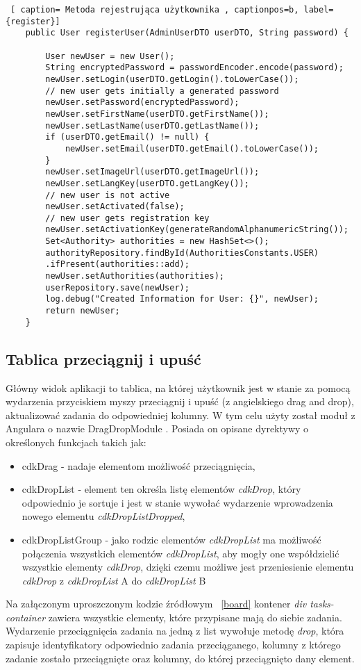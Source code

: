 \begin{lstlisting} [ caption= Metoda rejestrująca użytkownika , captionpos=b, label={register}]
	public User registerUser(AdminUserDTO userDTO, String password) {
		
		User newUser = new User();
		String encryptedPassword = passwordEncoder.encode(password);
		newUser.setLogin(userDTO.getLogin().toLowerCase());
		// new user gets initially a generated password
		newUser.setPassword(encryptedPassword);
		newUser.setFirstName(userDTO.getFirstName());
		newUser.setLastName(userDTO.getLastName());
		if (userDTO.getEmail() != null) {
			newUser.setEmail(userDTO.getEmail().toLowerCase());
		}
		newUser.setImageUrl(userDTO.getImageUrl());
		newUser.setLangKey(userDTO.getLangKey());
		// new user is not active
		newUser.setActivated(false);
		// new user gets registration key
		newUser.setActivationKey(generateRandomAlphanumericString());
		Set<Authority> authorities = new HashSet<>();
		authorityRepository.findById(AuthoritiesConstants.USER)
		.ifPresent(authorities::add);
		newUser.setAuthorities(authorities);
		userRepository.save(newUser);
		log.debug("Created Information for User: {}", newUser);
		return newUser;
	}
\end{lstlisting}
\clearpage
\subsection{Tablica przeciągnij i upuść}
Główny widok aplikacji to tablica, na której użytkownik jest w stanie za pomocą wydarzenia przyciskiem myszy przeciągnij i upuść (z angielskiego drag and drop), aktualizować zadania do odpowiedniej kolumny. W tym celu użyty został moduł z Angulara o nazwie DragDropModule \cite{draganddrop}. Posiada on opisane dyrektywy o określonych funkcjach takich jak:
\begin{itemize}
	\item cdkDrag - nadaje elementom możliwość przeciągnięcia,
	\item cdkDropList - element ten określa listę elementów \textit{cdkDrop}, który odpowiednio je sortuje i jest w stanie wywołać wydarzenie wprowadzenia nowego elementu \textit{cdkDropListDropped},
	\item cdkDropListGroup - jako rodzic elementów \textit{cdkDropList} ma możliwość połączenia wszystkich elementów \textit{cdkDropList}, aby mogły one współdzielić wszystkie elementy  \textit{cdkDrop}, dzięki czemu możliwe jest  przeniesienie elementu \textit{cdkDrop}  z \textit{cdkDropList} A do \textit{cdkDropList} B
\end{itemize}
Na załączonym uproszczonym kodzie źródłowym ~\ref{board} kontener \textit{div tasks-container} zawiera wszystkie elementy, które przypisane mają do siebie zadania. Wydarzenie przeciągnięcia zadania na jedną z list wywołuje metodę \textit{drop}, która zapisuje identyfikatory odpowiednio zadania przeciąganego, kolumny z którego zadanie zostało przeciągnięte oraz kolumny, do której przeciągnięto dany element.


